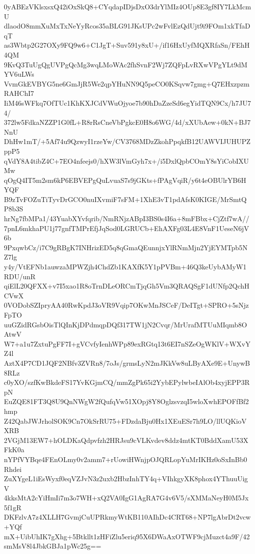 0yABEzVKlsxsxQ42iOxSkQ8+CYqdapIDjsDxO3drYlMIz4OUp8E3gf8IY7LkMcmU
dlaodO8mmXuMxTxNeYyRcos35aBLG91JKsUPc2wFvlEzQdUjt9i9FOm1xkTfaDqT
as3Wbtp2G27OXy9FQ9w6+C1JgT+Suv591y8xU+/if16HxUyfMQXRfaSn/FEhH4QM
9KvQ3TuUgQgUVPgQcMg3wqLMoWAc2fhSvnF2Wj7ZQFpLvRXwVPgYLt9dMYV6uLWs
VvmGkEVBYG5ne6GmJjR5We2qpYHuNN9Q5peCO0KSqvw7gmg+Q7EHxzpzmRAHChI7
IiM46sWFkq7OfTUc1KhKXJCdVWuOjyoe7b90hDaZzeSd6egYidTQN9Cx/h7JU74/
372lw5FdkaNZZP1G0fL+R8rRsCneVbPgkcE0H8o6WG/4d/xXUbAew+0kN+BJ7NnU
DhHw1mT/+5Af74u9QzwyI1rzeYw/CV3768MDzZkohPpqkfB12UAWVIJUHUPZppP5
qVdY8A4tibZ4C+7EO4nfeejs0/hXW3lVmGyh7x+/i5DxlQpbCOmY8sYiCobIXUMw
qOgQ4IT5m2sm6kP6EBVEPgQuLvuaS7s9jGKts+fPAgVqiR/y6t4eOBUlrYB6HYQF
B9zTvFOZuTiTyvDrGCO0nuIXvmiF7sFM+1XhE3vT1pdAfsK0KIGE/MrSmtQP8b3S
hrNg7fbMPa1/43YuabXYvfqrib/NmRNjzABpI3BS0s4I6a+8mFBbx+CjZtf7wA//
7pnL6mkhaPU1j77gnfTMPrEfjJqSod0LGRUCb+EhAXFg03L4E8VnF1UeseN6jV6b
9PxqwbCz/i7C9gRBgK7INHrizED5q8qGmaQEunnjxYlRNmMjn2YjEYMTpb5NZ7lg
y4y/VtEFNb1auwzaMPWZjh4ChdZb1KAXfK5Y1pPVBm+46Q3keUybAMyW1RDU/unR
qiElL20QFXX+v7I5xao1R8oTrnDLeORCmTjqGh5Vm3QRAQSgF1dUNfp2QchHCVwX
0VODobSZIpryAA40RwKpdJ3oVR9Vqip7OKwMnJSCeF/DeITgt+SPRO+5sNjzFpTO
uuGZidRGsbOisTlQInKjDPdmqpDQf317TW1jN2Cvqr/MrUrafMTUuMIqmb8OAtwV
W7+a1u7ZxtuPgFF7I+gVCvfyIenhWPp89exRGtq13t6EI7nSZeOgWKlV+WXvYZ4l
AztX4P7CD1JQF2NBfv3ZVRn8/7oJs/grmsLyN2mJKkVw8uLByAXe9E+UnywB8RLz
c0yXO/szfKwBkdeFS17YvKGjmCQ/mmZgPk65i2YybEPylwbeIAlOb4xyjEPP3RpN
EuZQE81FT3Q8U9QnNWgW2fQufqVw51XOpj8Y8OglzsvzqI5wloXwhEPOFfBf2hmp
Z42QabJWJrholSOK9Cn7OkSrRU75+FDzdaBju0Hx1XEuESr7h9LO/llUQKioVXRB
2VGjM13EW7+hOLDKaQdpvfzh2HRJsu9cVLKvdev8ddz4mtKT0BddXamU53XFkK0a
nYPfVYBqe4FEnOLmy0v2amm7+rUowiHWnjpOJQRLopYuMrIKHz0oSxInBb0Rhdei
ZuXYgeL1iEsWyxf0eqVZJvN3z2uxb2HbzInhTY4q+VIhkgyXK8phox4YThuuUigV
4kksMtA2cYiHmIi7m3o7WH+xQ2VA0IgG1AgRA7G4v6V5/sXMMaNeyH0M5Jx5f1gR
DKFzlvA7z4XLLH7GvmjCuUPRkmyWtKB110AIhDc4CRT68+NP7lgAbrDt2vcw+YQf
mX+UibUhIK7gXhg+5Btkllt1zHFiZlu5eriq95X6DWaAxOTWF9cjMuzct4a9F/42
smMsV8l4JbkGBJa1pWc25g==

